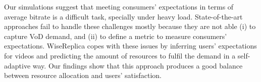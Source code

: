 Our simulations suggest that meeting consumers' expectations in terms of average bitrate is a difficult task, specially under heavy load. State-of-the-art approaches fail to handle these challenges mostly because they are not able (i) to capture VoD demand, and (ii) to define a metric to measure consumers' expectations. WiseReplica copes with these issues by inferring users' expectations for videos and predicting the amount of resources to fulfil the demand in a self-adaptive way. Our findings show that this approach produces a good balance between resource allocation and users' satisfaction.

